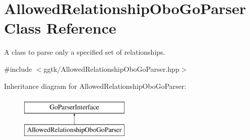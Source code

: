 \hypertarget{classAllowedRelationshipOboGoParser}{}\section{Allowed\+Relationship\+Obo\+Go\+Parser Class Reference}
\label{classAllowedRelationshipOboGoParser}


A class to parse only a specified set of relationships.  




{\ttfamily \#include $<$ggtk/\+Allowed\+Relationship\+Obo\+Go\+Parser.\+hpp$>$}

Inheritance diagram for Allowed\+Relationship\+Obo\+Go\+Parser\+:\begin{figure}[H]
\begin{center}
\leavevmode
\includegraphics[height=2.000000cm]{classAllowedRelationshipOboGoParser}
\end{center}
\end{figure}
